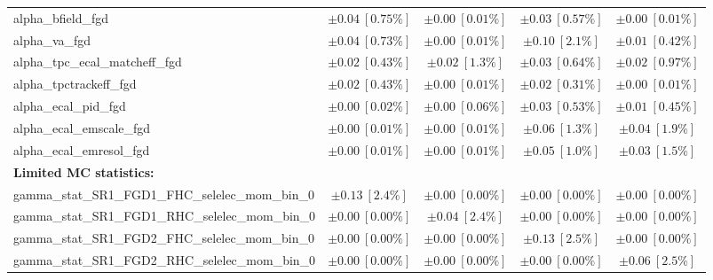 \begin{table}
\begin{center}
\begin{tabular*}{\textwidth}{@{\extracolsep{\fill}}lcccc}
alpha\_bfield\_fgd         & $\pm 0.04\ [0.75\%] $          & $\pm 0.00\ [0.01\%] $          & $\pm 0.03\ [0.57\%] $          & $\pm 0.00\ [0.01\%] $       \\
alpha\_va\_fgd         & $\pm 0.04\ [0.73\%] $          & $\pm 0.00\ [0.01\%] $          & $\pm 0.10\ [2.1\%] $          & $\pm 0.01\ [0.42\%] $       \\
alpha\_tpc\_ecal\_matcheff\_fgd         & $\pm 0.02\ [0.43\%] $          & $\pm 0.02\ [1.3\%] $          & $\pm 0.03\ [0.64\%] $          & $\pm 0.02\ [0.97\%] $       \\
alpha\_tpctrackeff\_fgd         & $\pm 0.02\ [0.43\%] $          & $\pm 0.00\ [0.01\%] $          & $\pm 0.02\ [0.31\%] $          & $\pm 0.00\ [0.01\%] $       \\
alpha\_ecal\_pid\_fgd         & $\pm 0.00\ [0.02\%] $          & $\pm 0.00\ [0.06\%] $          & $\pm 0.03\ [0.53\%] $          & $\pm 0.01\ [0.45\%] $       \\
alpha\_ecal\_emscale\_fgd         & $\pm 0.00\ [0.01\%] $          & $\pm 0.00\ [0.01\%] $          & $\pm 0.06\ [1.3\%] $          & $\pm 0.04\ [1.9\%] $       \\
alpha\_ecal\_emresol\_fgd         & $\pm 0.00\ [0.01\%] $          & $\pm 0.00\ [0.01\%] $          & $\pm 0.05\ [1.0\%] $          & $\pm 0.03\ [1.5\%] $       \\
{\bf Limited MC statistics:} \\
gamma\_stat\_SR1\_FGD1\_FHC\_selelec\_mom\_bin\_0         & $\pm 0.13\ [2.4\%] $          & $\pm 0.00\ [0.00\%] $          & $\pm 0.00\ [0.00\%] $          & $\pm 0.00\ [0.00\%] $       \\
gamma\_stat\_SR1\_FGD1\_RHC\_selelec\_mom\_bin\_0         & $\pm 0.00\ [0.00\%] $          & $\pm 0.04\ [2.4\%] $          & $\pm 0.00\ [0.00\%] $          & $\pm 0.00\ [0.00\%] $       \\
gamma\_stat\_SR1\_FGD2\_FHC\_selelec\_mom\_bin\_0         & $\pm 0.00\ [0.00\%] $          & $\pm 0.00\ [0.00\%] $          & $\pm 0.13\ [2.5\%] $          & $\pm 0.00\ [0.00\%] $       \\
gamma\_stat\_SR1\_FGD2\_RHC\_selelec\_mom\_bin\_0         & $\pm 0.00\ [0.00\%] $          & $\pm 0.00\ [0.00\%] $          & $\pm 0.00\ [0.00\%] $          & $\pm 0.06\ [2.5\%] $       \\

\end{tabular*}
\end{center}
\end{table}
